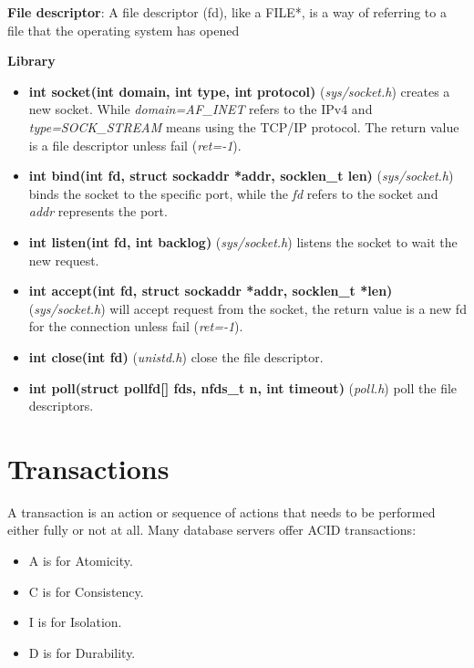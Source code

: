 \documentclass{article}
\begin{document}
\textbf{File descriptor}: A file descriptor (fd), like a FILE*, is a way of referring to a file that the operating system has opened


\textbf{Library}

\begin{itemize}
    \item \textbf{int socket(int domain, int type, int protocol)} (\textit{sys/socket.h}) creates a new socket. While \textit{domain=AF\_INET} refers to the IPv4 and \textit{type=SOCK\_STREAM} means using the TCP/IP protocol. The return value is a file descriptor unless fail (\textit{ret=-1}).
    
    \item \textbf{int bind(int fd, struct sockaddr *addr, socklen\_t len)} (\textit{sys/socket.h}) binds the socket to the specific port, while the \textit{fd} refers to the socket and \textit{addr} represents the port.
    
    \item \textbf{int listen(int fd, int backlog)} (\textit{sys/socket.h}) listens the socket to wait the new request.
    
    \item \textbf{int accept(int fd, struct sockaddr *addr, socklen\_t *len)} (\textit{sys/socket.h}) will accept request from the socket, the return value is a new fd for the connection unless fail (\textit{ret=-1}).
    
    \item \textbf{int close(int fd)} (\textit{unistd.h}) close the file descriptor.
    
    \item \textbf{int poll(struct pollfd[] fds, nfds\_t n, int timeout)} (\textit{poll.h}) poll the file descriptors.
\end{itemize}


\section{Transactions}

A transaction is an action or sequence of actions that needs to be performed either fully or not at all. Many database servers offer ACID transactions:

\begin{itemize}
    \item A is for Atomicity.
    \item C is for Consistency.
    \item I is for Isolation.
    \item D is for Durability.
\end{itemize}
\end{document}
